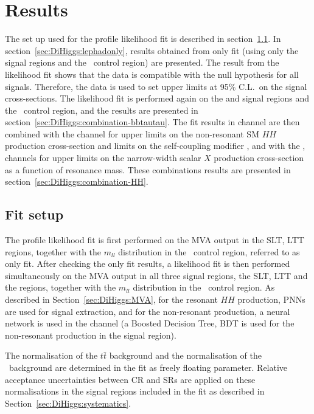 \section{Results}
\label{sec:DiHiggs:results}

The set up used for the profile likelihood fit is described in section~\ref{sec:DiHiggs:analysis}.
In section~\ref{sec:DiHiggs:lephadonly}, results obtained from 
\lephad only fit (using only the \lephad signal regions and the \ZHF\ control region)
are presented.
The result from the likelihood fit shows that the data is compatible with
the null hypothesis for all signals. Therefore, the data is used to set
upper limits at 95\% C.L.\ on the signal cross-sections. 
The likelihood fit is performed again on the \lephad and 
\hadhad signal regions and the \ZHF\ control region,
and the results are presented in
section~\ref{sec:DiHiggs:combination-bbtautau}.
The fit results in \bbtt channel are then combined with the \bbyy channel
for upper limits on the non-resonant SM $HH$ production cross-section and 
limits on the self-coupling modifier \kl,
and with the \bbyy, \bbbb channels for upper limits
on the narrow-width scalar $X$ production cross-section as a function of resonance mass.
These combinations results are presented in section~\ref{sec:DiHiggs:combination-HH}.

\subsection{Fit setup}
\label{sec:DiHiggs:analysis}

The profile likelihood fit is first performed on the MVA output in the \lephad SLT, LTT regions, 
together with the $m_{ll}$ distribution in the 
\ZHF\ control region, referred to as \lephad only fit. After checking the \lephad only fit results, 
a likelihood fit is then performed simultaneously on the MVA output in all three signal regions, the \lephad SLT, LTT
and the \hadhad regions, together with the $m_{ll}$ distribution in the \ZHF\ control region.
As described in Section~\ref{sec:DiHiggs:MVA}, for the resonant $HH$ production, PNNs are used for 
signal extraction, and for the non-resonant production, a neural network is used in the \lephad channel 
(a Boosted Decision Tree, BDT is used for the non-resonant production in the \hadhad signal region).  

The normalisation of the $t\bar{t}$ background and the normalisation of the \ZHF\ background 
are determined in the fit as freely floating parameter.  
Relative acceptance uncertainties between CR and SRs are applied on 
these normalisations in the signal regions included in the fit as described in Section~\ref{sec:DiHiggs:systematics}.

